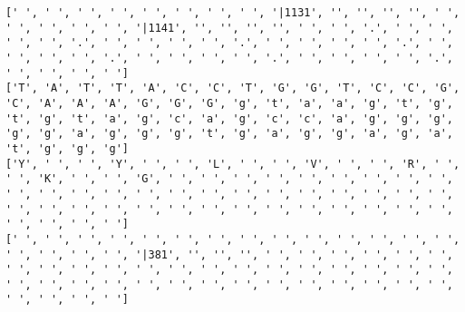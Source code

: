\documentclass{article}
\begin{document}
\begin{Verbatim}
[' ', ' ', ' ', ' ', ' ', ' ', ' ', ' ', '|1131', '', '', '', '', ' ', ' ', ' ', ' ', ' ', '|1141', '', '', '', '', ' ', ' ', '.', ' ', ' ', ' ', ' ', '.', ' ', ' ', ' ', ' ', '.', ' ', ' ', ' ', ' ', '.', ' ', ' ', ' ', ' ', '.', ' ', ' ', ' ', ' ', '.', ' ', ' ', ' ', ' ', '.', ' ', ' ', ' ', ' ']
['T', 'A', 'T', 'T', 'A', 'C', 'C', 'T', 'G', 'G', 'T', 'C', 'C', 'G', 'C', 'A', 'A', 'A', 'G', 'G', 'G', 'g', 't', 'a', 'a', 'g', 't', 'g', 't', 'g', 't', 'a', 'g', 'c', 'a', 'g', 'c', 'c', 'a', 'g', 'g', 'g', 'g', 'g', 'a', 'g', 'g', 'g', 't', 'g', 'a', 'g', 'g', 'a', 'g', 'a', 't', 'g', 'g', 'g']
['Y', ' ', ' ', 'Y', ' ', ' ', 'L', ' ', ' ', 'V', ' ', ' ', 'R', ' ', ' ', 'K', ' ', ' ', 'G', ' ', ' ', ' ', ' ', ' ', ' ', ' ', ' ', ' ', ' ', ' ', ' ', ' ', ' ', ' ', ' ', ' ', ' ', ' ', ' ', ' ', ' ', ' ', ' ', ' ', ' ', ' ', ' ', ' ', ' ', ' ', ' ', ' ', ' ', ' ', ' ', ' ', ' ', ' ', ' ', ' ']
[' ', ' ', ' ', ' ', ' ', ' ', ' ', ' ', ' ', ' ', ' ', ' ', ' ', ' ', ' ', ' ', ' ', ' ', '|381', '', '', '', ' ', ' ', ' ', ' ', ' ', ' ', ' ', ' ', ' ', ' ', ' ', ' ', ' ', ' ', ' ', ' ', ' ', ' ', ' ', ' ', ' ', ' ', ' ', ' ', ' ', ' ', ' ', ' ', ' ', ' ', ' ', ' ', ' ', ' ', ' ', ' ', ' ', ' ']
  

\end{Verbatim}
\end{document}
